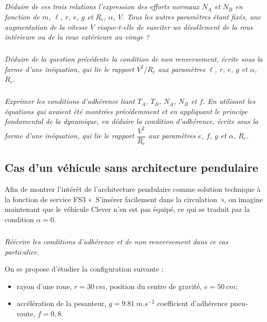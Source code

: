 \begin{multicols}{2}
\subparagraph{}\textit{Déduire de ces trois relations l'expression des efforts normaux $N_A$ et $N_B$ en fonction de $m$, $\ell$, $r$, $e$, $g$ et $R_c$, $\alpha$, $V$. Tous les autres paramètres étant fixés, une augmentation de la vitesse $V$ risque-t-elle de susciter un décollement de la roue intérieure ou de la roue extérieure au virage ?}
\ifprof
\begin{corrige}
\end{corrige}
\else
\fi


\subparagraph{}\textit{Déduire de la question précédente la condition de non renversement, écrite sous la forme d'une inéquation, qui lie le rapport $V^2/R_c$ aux paramètres $\ell$, $r$, $e$, $g$ et $\alpha$, $R_c$.}
\ifprof
\begin{corrige}
\end{corrige}
\else
\fi


\subparagraph{}\textit{Exprimer les conditions d'adhérence liant $T_A$, $T_B$, $N_A$, $N_B$ et $f$. En utilisant les équations qui avaient été montrées précédemment et en appliquant le principe fondamental de la dynamique, en déduire la condition d'adhérence, écrite sous la forme d'une inéquation, qui lie le rapport $\dfrac{V^2}{R_c}$ aux paramètres $e$, $f$, $g$ et $\alpha$, $R_c$.}
\ifprof
\begin{corrige}
\end{corrige}
\else
\fi
 
 
 
\subsection{Cas d'un véhicule sans architecture pendulaire}
 Afin de montrer l'intérêt de l'architecture pendulaire comme solution technique à la fonction de service FS3 «~S'insérer facilement dans la circulation~», on imagine maintenant que le véhicule Clever n'en est pas équipé, ce qui se traduit par la condition $\alpha = 0$.
 
 
\subparagraph{}\textit{Réécrire les conditions d'adhérence et de non renversement dans ce cas particulier. }
\ifprof
\begin{corrige}
\end{corrige}
\else
\fi

\vspace{.5cm}
 
 On se propose d'étudier la configuration suivante :
 \begin{itemize}
 \item rayon d'une roue, $r = \SI{30}{cm}$, position du centre de gravité, $e = \SI{50}{cm}$;
 \item accélération de la pesanteur, $g = \SI{9,81}{m.s^{-2}}$ coefficient d'adhérence pneu-route, $f = 0,8$.
\end{itemize}



\end{multicols}
